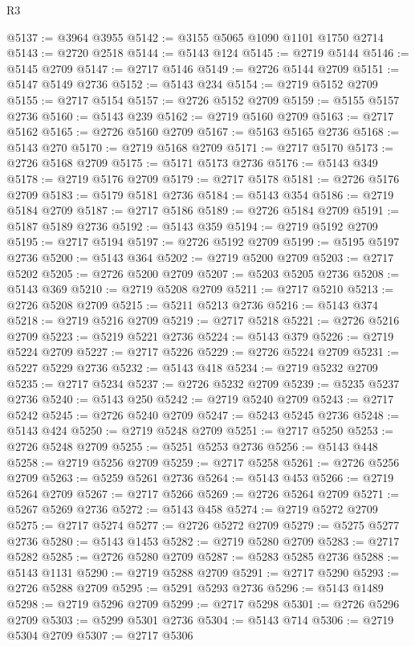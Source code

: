 \begin{lexlean}{R3}
\begin{coremodule}
@5137 := @3964 @3955
@5142 := @3155 @5065 @1090 @1101 @1750 @2714
@5143 := @2720 @2518
@5144 := @5143 @124
@5145 := @2719 @5144
@5146 := @5145 @2709
@5147 := @2717 @5146
@5149 := @2726 @5144 @2709
@5151 := @5147 @5149 @2736
@5152 := @5143 @234
@5154 := @2719 @5152 @2709
@5155 := @2717 @5154
@5157 := @2726 @5152 @2709
@5159 := @5155 @5157 @2736
@5160 := @5143 @239
@5162 := @2719 @5160 @2709
@5163 := @2717 @5162
@5165 := @2726 @5160 @2709
@5167 := @5163 @5165 @2736
@5168 := @5143 @270
@5170 := @2719 @5168 @2709
@5171 := @2717 @5170
@5173 := @2726 @5168 @2709
@5175 := @5171 @5173 @2736
@5176 := @5143 @349
@5178 := @2719 @5176 @2709
@5179 := @2717 @5178
@5181 := @2726 @5176 @2709
@5183 := @5179 @5181 @2736
@5184 := @5143 @354
@5186 := @2719 @5184 @2709
@5187 := @2717 @5186
@5189 := @2726 @5184 @2709
@5191 := @5187 @5189 @2736
@5192 := @5143 @359
@5194 := @2719 @5192 @2709
@5195 := @2717 @5194
@5197 := @2726 @5192 @2709
@5199 := @5195 @5197 @2736
@5200 := @5143 @364
@5202 := @2719 @5200 @2709
@5203 := @2717 @5202
@5205 := @2726 @5200 @2709
@5207 := @5203 @5205 @2736
@5208 := @5143 @369
@5210 := @2719 @5208 @2709
@5211 := @2717 @5210
@5213 := @2726 @5208 @2709
@5215 := @5211 @5213 @2736
@5216 := @5143 @374
@5218 := @2719 @5216 @2709
@5219 := @2717 @5218
@5221 := @2726 @5216 @2709
@5223 := @5219 @5221 @2736
@5224 := @5143 @379
@5226 := @2719 @5224 @2709
@5227 := @2717 @5226
@5229 := @2726 @5224 @2709
@5231 := @5227 @5229 @2736
@5232 := @5143 @418
@5234 := @2719 @5232 @2709
@5235 := @2717 @5234
@5237 := @2726 @5232 @2709
@5239 := @5235 @5237 @2736
@5240 := @5143 @250
@5242 := @2719 @5240 @2709
@5243 := @2717 @5242
@5245 := @2726 @5240 @2709
@5247 := @5243 @5245 @2736
@5248 := @5143 @424
@5250 := @2719 @5248 @2709
@5251 := @2717 @5250
@5253 := @2726 @5248 @2709
@5255 := @5251 @5253 @2736
@5256 := @5143 @448
@5258 := @2719 @5256 @2709
@5259 := @2717 @5258
@5261 := @2726 @5256 @2709
@5263 := @5259 @5261 @2736
@5264 := @5143 @453
@5266 := @2719 @5264 @2709
@5267 := @2717 @5266
@5269 := @2726 @5264 @2709
@5271 := @5267 @5269 @2736
@5272 := @5143 @458
@5274 := @2719 @5272 @2709
@5275 := @2717 @5274
@5277 := @2726 @5272 @2709
@5279 := @5275 @5277 @2736
@5280 := @5143 @1453
@5282 := @2719 @5280 @2709
@5283 := @2717 @5282
@5285 := @2726 @5280 @2709
@5287 := @5283 @5285 @2736
@5288 := @5143 @1131
@5290 := @2719 @5288 @2709
@5291 := @2717 @5290
@5293 := @2726 @5288 @2709
@5295 := @5291 @5293 @2736
@5296 := @5143 @1489
@5298 := @2719 @5296 @2709
@5299 := @2717 @5298
@5301 := @2726 @5296 @2709
@5303 := @5299 @5301 @2736
@5304 := @5143 @714
@5306 := @2719 @5304 @2709
@5307 := @2717 @5306

\end{coremodule}
\end{lexlean}
